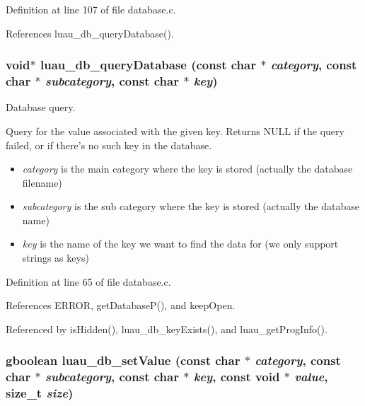 Definition at line 107 of file database.c.

References luau\_\-db\_\-query\-Database().
\subsubsection{\setlength{\rightskip}{0pt plus 5cm}void$\ast$ luau\_\-db\_\-query\-Database (const char $\ast$ {\em category}, const char $\ast$ {\em subcategory}, const char $\ast$ {\em key})}\label{database_8c_a4}


Database query. 

Query for the value associated with the given key. Returns NULL if the query failed, or if there's no such key in the database.

\begin{itemize}
\item {\em category\/} is the main category where the key is stored (actually the database filename) \item {\em subcategory\/} is the sub category where the key is stored (actually the database name) \item {\em key\/} is the name of the key we want to find the data for (we only support strings as keys) 
\end{itemize}


Definition at line 65 of file database.c.

References ERROR, get\-Database\-P(), and keep\-Open.

Referenced by is\-Hidden(), luau\_\-db\_\-key\-Exists(), and luau\_\-get\-Prog\-Info().
\subsubsection{\setlength{\rightskip}{0pt plus 5cm}gboolean luau\_\-db\_\-set\-Value (const char $\ast$ {\em category}, const char $\ast$ {\em subcategory}, const char $\ast$ {\em key}, const void $\ast$ {\em value}, size\_\-t {\em size})}\label{database_8c_a8}


